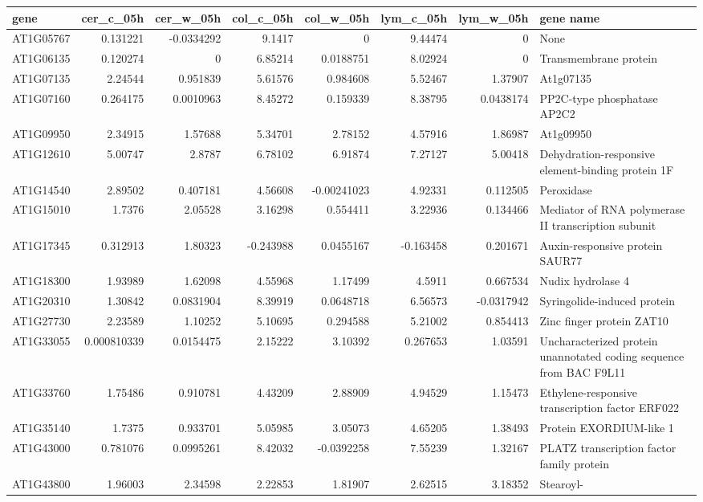 \documentclass[11pt]{article}
\begin{document}
\begin{center}
\begin{tabular}{lrrrrrrl}
gene & cer\_c\_05h & cer\_w\_05h & col\_c\_05h & col\_w\_05h & lym\_c\_05h & lym\_w\_05h & gene name\\
\hline
AT1G05767 & 0.131221 & -0.0334292 & 9.1417 & 0 & 9.44474 & 0 & None\\
AT1G06135 & 0.120274 & 0 & 6.85214 & 0.0188751 & 8.02924 & 0 & Transmembrane protein\\
AT1G07135 & 2.24544 & 0.951839 & 5.61576 & 0.984608 & 5.52467 & 1.37907 & At1g07135\\
AT1G07160 & 0.264175 & 0.0010963 & 8.45272 & 0.159339 & 8.38795 & 0.0438174 & PP2C-type phosphatase AP2C2\\
AT1G09950 & 2.34915 & 1.57688 & 5.34701 & 2.78152 & 4.57916 & 1.86987 & At1g09950\\
AT1G12610 & 5.00747 & 2.8787 & 6.78102 & 6.91874 & 7.27127 & 5.00418 & Dehydration-responsive element-binding protein 1F\\
AT1G14540 & 2.89502 & 0.407181 & 4.56608 & -0.00241023 & 4.92331 & 0.112505 & Peroxidase\\
AT1G15010 & 1.7376 & 2.05528 & 3.16298 & 0.554411 & 3.22936 & 0.134466 & Mediator of RNA polymerase II transcription subunit\\
AT1G17345 & 0.312913 & 1.80323 & -0.243988 & 0.0455167 & -0.163458 & 0.201671 & Auxin-responsive protein SAUR77\\
AT1G18300 & 1.93989 & 1.62098 & 4.55968 & 1.17499 & 4.5911 & 0.667534 & Nudix hydrolase 4\\
AT1G20310 & 1.30842 & 0.0831904 & 8.39919 & 0.0648718 & 6.56573 & -0.0317942 & Syringolide-induced protein\\
AT1G27730 & 2.23589 & 1.10252 & 5.10695 & 0.294588 & 5.21002 & 0.854413 & Zinc finger protein ZAT10\\
AT1G33055 & 0.000810339 & 0.0154475 & 2.15222 & 3.10392 & 0.267653 & 1.03591 & Uncharacterized protein unannotated coding sequence from BAC F9L11\\
AT1G33760 & 1.75486 & 0.910781 & 4.43209 & 2.88909 & 4.94529 & 1.15473 & Ethylene-responsive transcription factor ERF022\\
AT1G35140 & 1.7375 & 0.933701 & 5.05985 & 3.05073 & 4.65205 & 1.38493 & Protein EXORDIUM-like 1\\
AT1G43000 & 0.781076 & 0.0995261 & 8.42032 & -0.0392258 & 7.55239 & 1.32167 & PLATZ transcription factor family protein\\
AT1G43800 & 1.96003 & 2.34598 & 2.22853 & 1.81907 & 2.62515 & 3.18352 & Stearoyl-\\

\end{tabular}
\end{center}
\end{document}
